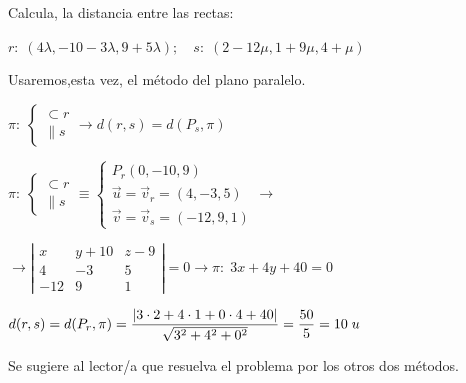 \begin{ejre}
Calcula,  la distancia	entre las rectas:

$r:\; (4\lambda,-10-3\lambda,9+5\lambda);\quad s:\; (2-12\mu, 1+9\mu,4+\mu)$
\end{ejre}
\begin{proofw}\renewcommand{\qedsymbol}{$\diamond$}	
\noindent Usaremos,esta vez, el método del plano paralelo.

\noindent $\pi:\;\begin{cases} \subset r \\ \parallel s \end{cases} \to d(r,s)=d(P_s,\pi)$

\noindent  $\pi:\;\begin{cases} \subset r \\ \parallel s \end{cases} \equiv \begin{cases} P_r(0,-10,9) \\ \vec u=\vec v_r=(4,-3,5) \\ \vec v=\vec v_s=(-12,9,1) \end{cases} \to $

\noindent $\to \left| \begin{matrix} x&y+10&z-9\\4&-3&5\\-12&9&1 \end{matrix} \right|=0 \to \pi:\; 3x+4y+40=0$

\noindent $d(r,s)=d(P_r,\pi)=\dfrac {\abs{3\cdot 2+4\cdot 1+0\cdot 4+40}}{\sqrt{3^2+4^2+0^2}}=\dfrac {50}{5}=10\; u$

\noindent \textcolor{gris}{Se sugiere al lector/a que resuelva el problema por los otros dos métodos.}
\end{proofw}


